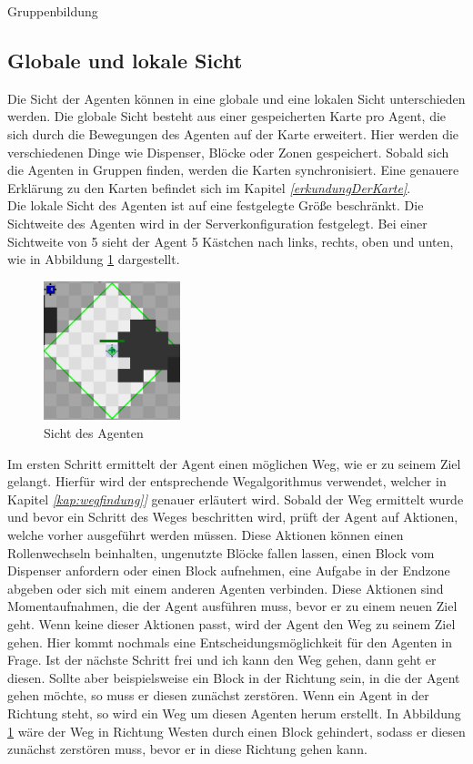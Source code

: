 Gruppenbildung

\subsection{Globale und lokale Sicht}
Die Sicht der Agenten können in eine globale und eine lokalen Sicht unterschieden werden. Die globale Sicht besteht aus einer gespeicherten Karte pro Agent, die sich durch die Bewegungen des Agenten auf der Karte erweitert. Hier werden die verschiedenen Dinge wie Dispenser, Blöcke oder Zonen gespeichert. Sobald sich die Agenten in Gruppen finden, werden die Karten synchronisiert. Eine genauere Erklärung zu den Karten befindet sich im Kapitel \textit{\ref{erkundungDerKarte}}.\\

Die lokale Sicht des Agenten ist auf eine festgelegte Größe beschränkt. Die Sichtweite des Agenten wird in der Serverkonfiguration festgelegt. Bei einer Sichtweite von 5 sieht der Agent 5 Kästchen nach links, rechts, oben und unten, wie in Abbildung \ref{fig:agentensicht} dargestellt.
\begin{figure}
	\centering
	\includegraphics[width=150px]{bilder/agentensicht}
	\caption{Sicht des Agenten}
	\label{fig:agentensicht}
\end{figure}

Im ersten Schritt ermittelt der Agent einen möglichen Weg, wie er zu seinem Ziel gelangt. Hierfür wird der entsprechende Wegalgorithmus verwendet, welcher in Kapitel \textit{\ref{kap:wegfindung}]} genauer erläutert wird. Sobald der Weg ermittelt wurde und bevor ein Schritt des Weges beschritten wird, prüft der Agent auf Aktionen, welche vorher ausgeführt werden müssen. Diese Aktionen können einen Rollenwechseln beinhalten, ungenutzte Blöcke fallen lassen, einen Block vom Dispenser anfordern oder einen Block aufnehmen, eine Aufgabe in der Endzone abgeben oder sich mit einem anderen Agenten verbinden. Diese Aktionen sind Momentaufnahmen, die der Agent ausführen muss, bevor er zu einem neuen Ziel geht. Wenn keine dieser Aktionen passt, wird der Agent den Weg zu seinem Ziel gehen. Hier kommt nochmals eine Entscheidungsmöglichkeit für den Agenten in Frage. Ist der nächste Schritt frei und ich kann den Weg gehen, dann geht er diesen. Sollte aber beispielsweise ein Block in der Richtung sein, in die der Agent gehen möchte, so muss er diesen zunächst zerstören. Wenn ein Agent in der Richtung steht, so wird ein Weg um diesen Agenten herum erstellt. In Abbildung \ref{fig:agentensicht} wäre der Weg in Richtung Westen durch einen Block gehindert, sodass er diesen zunächst zerstören muss, bevor er in diese Richtung gehen kann. 

